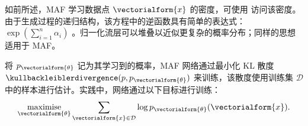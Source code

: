 如前所述，MAF 学习数据点 $\vectorialform{x}$ 的密度，可使用  访问该密度。由于生成过程的递归结构，该方程中的逆函数具有简单的表达式：$\textstyle\exp\left(\sum\nolimits_{i=1}^n\alpha_i\right)$ \cite{papamakarios2017masked}。归一化流层可以堆叠以近似更复杂的概率分布；同样的思想适用于 MAF。

将 $p_{\vectorialform{\theta}}$ 记为其学习到的概率，MAF 网络通过最小化 KL 散度 $\kullbackleiblerdivergence(p,p_{\vectorialform{\theta}})$ 来训练，该散度使用训练集 $\mathcal{D}$ 中的样本进行估计。实践中，网络通过以下目标进行训练：
\begin{align*}
    \underset{\vectorialform{\theta}}{\text{maximise}}   \sum_{\vectorialform{x}\in\mathcal{D}}\log p_{\vectorialform{\theta}} (\vectorialform{x}).
\end{align*}
